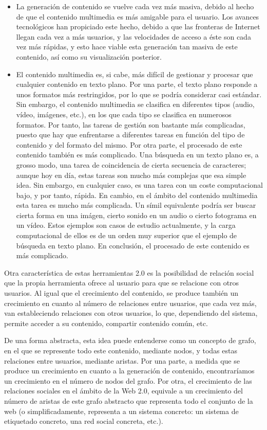 \begin{itemize}
	\item La generación de contenido se vuelve cada vez más masiva, debido al hecho de que el contenido multimedia es más amigable para el usuario. Los avances tecnológicos han propiciado este hecho, debido a que las fronteras de Internet llegan cada vez a más usuarios, y las velocidades de acceso a éste son cada vez más rápidas, y esto hace viable esta generación tan masiva de este contenido, así como su visualización posterior.
	\item El contenido multimedia es, si cabe, más difícil de gestionar y procesar que cualquier contenido en texto plano. Por una parte, el texto plano responde a unos formatos más restringidos, por lo que se podría considerar casi estándar. Sin embargo, el contenido multimedia se clasifica en diferentes tipos (audio, vídeo, imágenes, etc.), en los que cada tipo se clasifica en numerosos formatos. Por tanto, las tareas de gestión son bastante más complicadas, puesto que hay que enfrentarse a diferentes tareas en función del tipo de contenido y del formato del mismo. Por otra parte, el procesado de este contenido también es más complicado. Una búsqueda en un texto plano es, a grosso modo, una tarea de coincidencia de cierta secuencia de caracteres; aunque hoy en día, estas tareas son mucho más complejas que esa simple idea. Sin embargo, en cualquier caso, es una tarea con un coste computacional bajo, y por tanto, rápida. En cambio, en el ámbito del contenido multimedia esta tarea es mucho más complicada. Un símil equivalente podría ser buscar cierta forma en una imágen, cierto sonido en un audio o cierto fotograma en un vídeo. Estos ejemplos son casos de estudio actualmente, y la carga computacional de ellos es de un orden muy superior que el ejemplo de búsqueda en texto plano. En conclusión, el procesado de este contenido es más complicado.
\end{itemize}

Otra característica de estas herramientas 2.0 es la posibilidad de relación social que la propia herramienta ofrece al usuario para que se relacione con otros usuarios. Al igual que el crecimiento del contenido, se produce también un crecimiento en cuanto al número de relaciones entre usuarios, que cada vez más, van estableciendo relaciones con otros usuarios, lo que, dependiendo del sistema, permite acceder a su contenido, compartir contenido común, etc.

De una forma abstracta, esta idea puede entenderse como un concepto de grafo, en el que se represente todo este contenido, mediante nodos, y todas estas relaciones entre usuarios, mediante aristas. Por una parte, a medida que se produce un crecimiento en cuanto a la generación de contenido, encontraríamos un crecimiento en el número de nodos del grafo. Por otra, el crecimiento de las relaciones sociales en el ámbito de la Web 2.0, equivale a un crecimiento del número de aristas de este grafo abstracto que representa todo el conjunto de la web (o simplificadamente, representa a un sistema concreto: un sistema de etiquetado concreto, una red social concreta, etc.).

